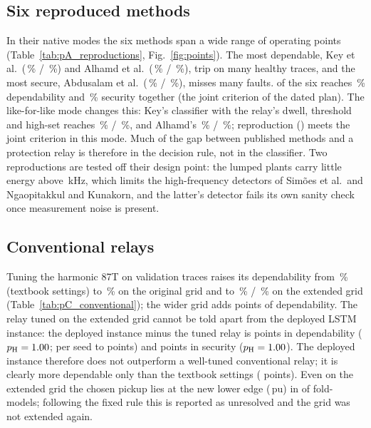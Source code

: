 \documentclass[preprint,12pt]{elsarticle}
\begin{document}
\subsection{Six reproduced methods}

In their native modes the six methods span a wide range of operating points (Table~\ref{tab:pA_reproductions}, Fig.~\ref{fig:points}). The most dependable, Key et al.\ (\depKeyN\,\% / \secKeyN\,\%) and Alhamd et al.\ (\depAlhN\,\% / \secAlhN\,\%), trip on many healthy traces, and the most secure, Abdusalam et al.\ (\depAbdN\,\% / \secAbdN\,\%), misses many faults. \nNatMeet{} of the six reaches \critDep\,\% dependability and \critSec\,\% security together (the joint criterion of the dated plan). The like-for-like mode changes this: Key's classifier with the relay's dwell, threshold and high-set reaches \depKeyL\,\% / \secKeyL\,\%, and Alhamd's \depAlhL\,\% / \secAlhL\,\%; \nLflMeet{} reproduction (\lflMeetNames) meets the joint criterion in this mode. Much of the gap between published methods and a protection relay is therefore in the decision rule, not in the classifier. Two reproductions are tested off their design point: the lumped plants carry little energy above \hfLimit\,kHz, which limits the high-frequency detectors of Sim\~oes et al.\ and Ngaopitakkul and Kunakorn, and the latter's detector fails its own sanity check once measurement noise is present.

\subsection{Conventional relays}

Tuning the harmonic 87T on validation traces raises its dependability from \depHb\,\% (textbook settings) to \depHt\,\% on the original grid and to \depHx\,\% / \secHx\,\% on the extended grid (Table~\ref{tab:pC_conventional}); the wider grid adds \depGainGrid{} points of dependability. The relay tuned on the extended grid cannot be told apart from the deployed LSTM instance: the deployed instance minus the tuned relay is \gapExt{} points in dependability ($p_{\mathrm{H}}=1.00$; per seed \gapExtSeedLo{} to \gapExtSeedHi{} points) and \gapExtSec{} points in security ($p_{\mathrm{H}}=1.00$). The deployed instance therefore does not outperform a well-tuned conventional relay; it is clearly more dependable only than the textbook settings (\gapTextbook{} points). Even on the extended grid the chosen pickup lies at the new lower edge (\pickupLowX\,pu) in \pickupEdgeX{} of \nFoldModels{} fold-models; following the fixed rule this is reported as unresolved and the grid was not extended again.
\end{document}

